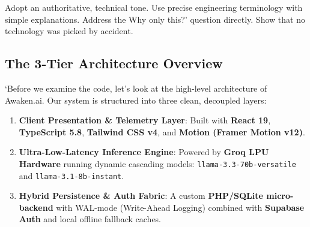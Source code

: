 \documentclass[11pt,a4paper]{article}
\begin{document}
\begin{speakercue}{Adopt an authoritative, technical tone. Use precise engineering terminology with simple explanations.}
Address the Why only this?' question directly. Show that no technology was picked by accident.
\end{speakercue}

\subsection{The 3-Tier Architecture Overview}
`Before we examine the code, let's look at the high-level architecture of Awaken.ai. Our system is structured into three clean, decoupled layers:

\begin{enumerate}[leftmargin=*]
    \item \textbf{Client Presentation \& Telemetry Layer}: Built with \textbf{React 19}, \textbf{TypeScript 5.8}, \textbf{Tailwind CSS v4}, and \textbf{Motion (Framer Motion v12)}.
    \item \textbf{Ultra-Low-Latency Inference Engine}: Powered by \textbf{Groq LPU Hardware} running dynamic cascading models: \texttt{llama-3.3-70b-versatile} and \texttt{llama-3.1-8b-instant}.
    \item \textbf{Hybrid Persistence \& Auth Fabric}: A custom \textbf{PHP/SQLite micro-backend} with WAL-mode (Write-Ahead Logging) combined with \textbf{Supabase Auth} and local offline fallback caches.
\end{enumerate}
\end{document}

